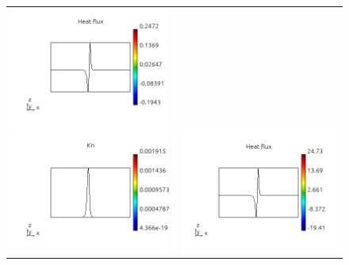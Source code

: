 \documentclass[review]{elsarticle}
\begin{document}
\begin{figure}[tbh]
\begin{center}
\begin{tabular}{cc}
      \includegraphics[width=\psize\textwidth]{figs/hflux_p61D1e12.png} \\
      \includegraphics[width=\psize\textwidth]{figs/Kn_p61D1e10.png} &
      \includegraphics[width=\psize\textwidth]{figs/hflux_p61D1e10.png} \\

\end{tabular}
\end{center}
\end{figure}
\end{document}
